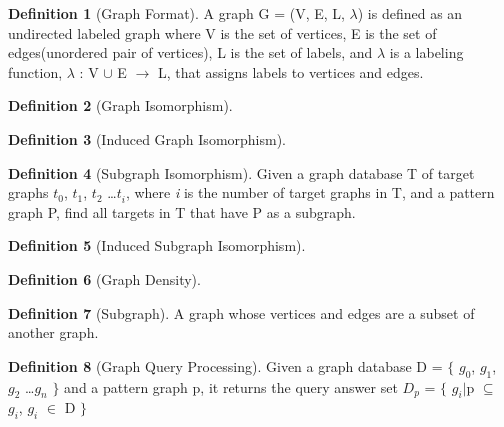 \documentclass{l4proj}
\theoremstyle{definition}
\newtheorem{myDef}{Definition}
\begin{document}
        \begin{myDef}[Graph Format]
        \label{def:graphFormat}
        A graph G = (V, E, L, $\lambda$) is defined as an undirected labeled graph where V is the set of vertices, E is the set of edges(unordered pair of vertices), L is the set of labels, and $\lambda$ is a labeling function, $\lambda$ : V $\cup$ E $\rightarrow$ L, that assigns labels to vertices and edges.
        \end{myDef}
        
        \begin{myDef}[Graph Isomorphism]
        
        \end{myDef}
        
        \begin{myDef}[Induced Graph Isomorphism]
        \label{def:inducedGraphIsomorphism}
        
        \end{myDef}

        \begin{myDef}[Subgraph Isomorphism]
        \label{def:subgraphIsomorphism}
        Given a graph database T of target graphs $t^{}_0$, $t^{}_1$, $t^{}_2$ \ldots $t^{}_i$, where \textit{i} is the number of target graphs in T, and a pattern graph P, find all targets in T that have P as a subgraph.
        \end{myDef}
        
        \begin{myDef}[Induced Subgraph Isomorphism]
        \label{def:inducedSubgraphIsomorphism}
        
        \end{myDef}
        
        \begin{myDef}[Graph Density]
        
        \end{myDef}
        
        \begin{myDef}[Subgraph]
        \label{def:subgraph}
        A graph whose vertices and edges are a subset of another graph.
        \end{myDef}
        
        \begin{myDef}[Graph Query Processing]
        \label{def:graphQueryProcessing}
        Given a graph database D = $\{$ $g^{}_0$, $g^{}_1$, $g^{}_2$ \ldots $g^{}_n$ $\}$ and a pattern graph p, it returns the query answer set $D^{}_p$ = $\{$ $g^{}_i$$\vert$p $\subseteq$ $g^{}_i$, $g^{}_i$ $\in$ D $\}$
        
        \end{myDef}
        
\end{document}
